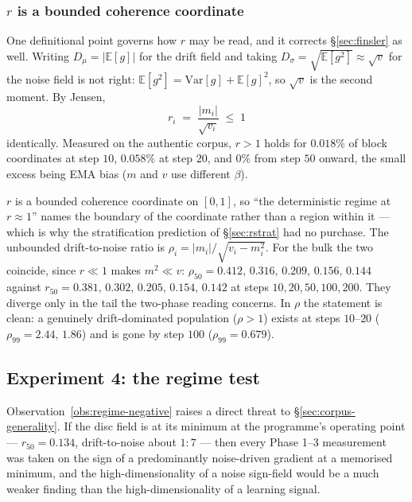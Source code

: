\subsubsection*{$r$ is a bounded coherence coordinate}

One definitional point governs how $r$ may be read, and it corrects
\S\ref{sec:finsler} as well. Writing $D_\mu=|\mathbb{E}[g]|$ for the drift
field and taking $D_\sigma=\sqrt{\mathbb{E}[g^2]}\approx\sqrt{v}$ for the noise
field is not right: $\mathbb{E}[g^2]=\mathrm{Var}[g]+\mathbb{E}[g]^2$, so
$\sqrt{v}$ is the second moment. By Jensen,
\[
r_i \;=\; \frac{|m_i|}{\sqrt{v_i}} \;\le\; 1
\]
identically. Measured on the authentic corpus, $r>1$ holds for $0.018\%$ of
block coordinates at step $10$, $0.058\%$ at step $20$, and $0\%$ from step
$50$ onward, the small excess being EMA bias ($m$ and $v$ use different
$\beta$).

\begin{observation}
\label{obs:r-bounded}
$r$ is a bounded coherence coordinate on $[0,1]$, so ``the deterministic regime
at $r\approx1$'' names the boundary of the coordinate rather than a region
within it --- which is why the stratification prediction of
\S\ref{sec:rstrat} had no purchase. The unbounded drift-to-noise ratio is
$\rho_i=|m_i|/\sqrt{v_i-m_i^2}$. For the bulk the two coincide, since $r\ll1$
makes $m^2\ll v$: $\rho_{50}=0.412,\,0.316,\,0.209,\,0.156,\,0.144$ against
$r_{50}=0.381,\,0.302,\,0.205,\,0.154,\,0.142$ at steps
$10,20,50,100,200$. They diverge only in the tail the two-phase reading
concerns. In $\rho$ the statement is clean: a genuinely drift-dominated
population ($\rho>1$) exists at steps $10$--$20$ ($\rho_{99}=2.44,\,1.86$) and
is gone by step $100$ ($\rho_{99}=0.679$).
\end{observation}

\subsection{Experiment 4: the regime test}
\label{sec:regime-test}

Observation~\ref{obs:regime-negative} raises a direct threat to
\S\ref{sec:corpus-generality}. If the disc field is at its minimum at the
programme's operating point --- $r_{50}=0.134$, drift-to-noise about $1{:}7$
--- then every Phase 1--3 measurement was taken on the sign of a
predominantly noise-driven gradient at a memorised minimum, and the
high-dimensionality of a noise sign-field would be a much weaker finding than
the high-dimensionality of a learning signal.

